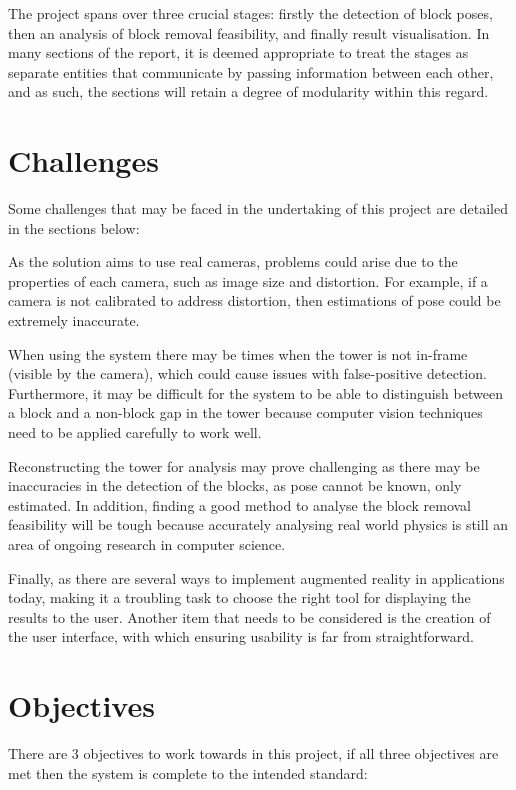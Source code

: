 The project spans over three crucial stages: firstly the detection of block poses, then an analysis of block removal feasibility, and finally result visualisation. In many sections of the report, it is deemed appropriate to treat the stages as separate entities that communicate by passing information between each other, and as such, the sections will retain a degree of modularity within this regard.

\section{Challenges} \label{sec:challenges}

Some challenges that may be faced in the undertaking of this project are detailed in the sections below:

As the solution aims to use real cameras, problems could arise due to the properties of each camera, such as image size and distortion. For example, if a camera is not calibrated to address distortion, then estimations of pose could be extremely inaccurate.

When using the system there may be times when the tower is not in-frame (visible by the camera), which could cause issues with false-positive detection. Furthermore, it may be difficult for the system to be able to distinguish between a block and a non-block gap in the tower because computer vision techniques need to be applied carefully to work well.

Reconstructing the tower for analysis may prove challenging as there may be inaccuracies in the detection of the blocks, as pose cannot be known, only estimated. In addition, finding a good method to analyse the block removal feasibility will be tough because accurately analysing real world physics is still an area of ongoing research in computer science.

Finally, as there are several ways to implement augmented reality in applications today, making it a troubling task to choose the right tool for displaying the results to the user.
Another item that needs to be considered is the creation of the user interface, with which ensuring usability is far from straightforward.

\section{Objectives}\label{objectives}

There are 3 objectives to work towards in this project, if all three objectives are met then the system is complete to the intended standard:

